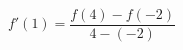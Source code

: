 \documentclass[preview]{standalone}
\begin{document}
\begin{align*}
f'(1) = \dfrac{f(4) - f(-2)}{4 - (-2)}
\end{align*}
\end{document}
